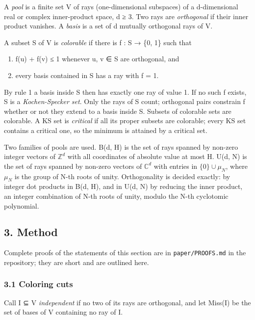\documentclass[11pt,a4paper]{article}
\providecommand{\tightlist}{\setlength{\itemsep}{0pt}\setlength{\parskip}{0pt}}
\begin{document}
A \emph{pool} is a finite set V of rays (one-dimensional subspaces) of a d-dimensional real or complex
inner-product space, d ≥ 3. Two rays are \emph{orthogonal} if their inner product vanishes. A \emph{basis} is a
set of d mutually orthogonal rays of V.

A subset S of V is \emph{colorable} if there is f : S → \{0, 1\} such that

\begin{enumerate}
\def\labelenumi{\arabic{enumi}.}
\tightlist
\item
  f(u) + f(v) ≤ 1 whenever u, v ∈ S are orthogonal, and
\item
  every basis contained in S has a ray with f = 1.
\end{enumerate}

By rule 1 a basis inside S then has exactly one ray of value 1. If no such f exists, S is a
\emph{Kochen-Specker set}.
Only the rays of S count; orthogonal pairs constrain f whether or not they extend to a basis inside S.
Subsets of colorable sets are colorable. A KS set is \emph{critical} if all its proper subsets are colorable;
every KS set contains a critical one, so the minimum is attained by a critical set.

Two families of pools are used. B(d, H) is the set of rays spanned by non-zero integer vectors of \(\mathbb{Z}^d\)
with all coordinates of absolute value at most H. U(d, N) is the set of rays spanned by non-zero vectors
of \(\mathbb{C}^d\) with entries in \(\{0\} \cup \mu_N\), where \(\mu_N\) is the group of N-th roots of unity. Orthogonality is decided
exactly: by integer dot products in B(d, H), and in U(d, N) by reducing the inner product, an integer
combination of N-th roots of unity, modulo the N-th cyclotomic polynomial.

\subsection{3. Method}\label{3-method}

Complete proofs of the statements of this section are in \texttt{paper/PROOFS.md} in the repository; they are
short and are outlined here.

\subsubsection{3.1 Coloring cuts}\label{31-coloring-cuts}

Call I ⊆ V \emph{independent} if no two of its rays are orthogonal, and let Miss(I) be the set of bases of V
containing no ray of I.
\end{document}
